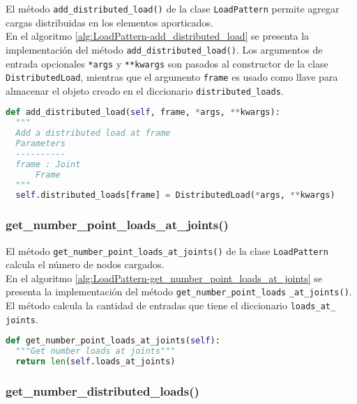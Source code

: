 El método \verb|add_distributed_load()| de la clase \verb|LoadPattern| permite agregar cargas distribuidas en los elementos aporticados.\\

En el algoritmo \ref{alg:LoadPattern-add_distributed_load} se presenta la implementación del método \verb|add_distributed_load()|. Los argumentos de entrada opcionales \verb|*args| y \verb|**kwargs| son pasados al constructor de la clase \verb|DistributedLoad|, mientras que el argumento \verb|frame| es usado como llave para almacenar el objeto creado en el diccionario \verb|distributed_loads|.\\

\begin{lstlisting}[language=Python,caption=Método \texttt{add\_distributed\_load()} de la clase \texttt{LoadPattern}.,label=alg:LoadPattern-add_distributed_load, frame=single]
def add_distributed_load(self, frame, *args, **kwargs):
  """
  Add a distributed load at frame
  Parameters
  ----------
  frame : Joint
      Frame
  """
  self.distributed_loads[frame] = DistributedLoad(*args, **kwargs)
\end{lstlisting}

\subsubsection{get\_number\_point\_loads\_at\_joints()}

El método \verb|get_number_point_loads_at_joints()| de la clase \verb|LoadPattern| calcula el número de nodos cargados.\\

En el algoritmo \ref{alg:LoadPattern-get_number_point_loads_at_joints} se presenta la implementación del método \verb|get_number_point_loads| \verb|_at_joints()|. El método calcula la cantidad de entradas que tiene el diccionario \verb|loads_at_| \verb|joints|.\\

\begin{lstlisting}[language=Python,caption=Método \texttt{get\_number\_point\_loads\_at\_joints()} de la clase \texttt{LoadPattern}.,label=alg:LoadPattern-get_number_point_loads_at_joints, frame=single]
def get_number_point_loads_at_joints(self):
  """Get number loads at joints"""
  return len(self.loads_at_joints)
\end{lstlisting}

\subsubsection{get\_number\_distributed\_loads()}

